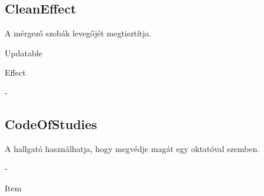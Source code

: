 \subsection{CleanEffect}
\begin{class-template-responsibility}
    A mérgező szobák levegőjét megtisztítja.
\end{class-template-responsibility}
\begin{class-template-interface}
    Updatable
\end{class-template-interface}
\begin{class-template-baseclass}
    Effect
\end{class-template-baseclass}
\begin{class-template-attribute}
    -
\end{class-template-attribute}
\begin{class-template-method}
\end{class-template-method}

\subsection{CodeOfStudies}
\begin{class-template-responsibility}
    A hallgató használhatja, hogy megvédje magát egy oktatóval szemben.
\end{class-template-responsibility}
\begin{class-template-interface}
    -
\end{class-template-interface}
\begin{class-template-baseclass}
    Item
\end{class-template-baseclass}
\begin{class-template-attribute}
\end{class-template-attribute}
\begin{class-template-method}
\end{class-template-method}

